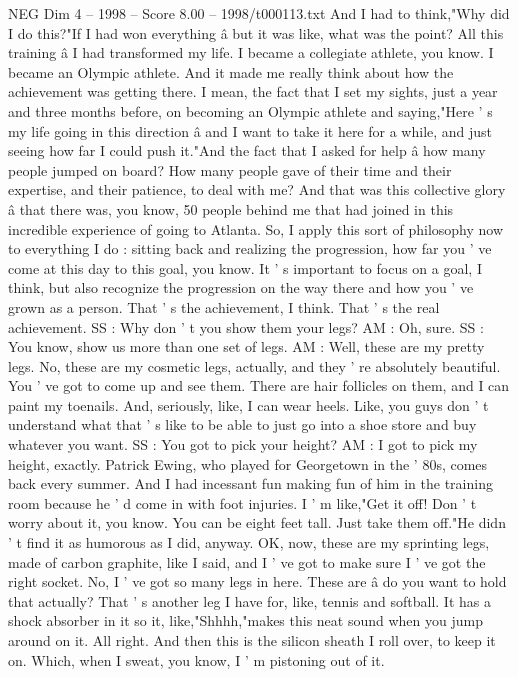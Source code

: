 \begin{textsample}{NEG Dim 4 – 1998 – Score 8.00 – 1998/t000113.txt}
And I had to think,"Why did I do this?"If I had won everything â but it was like, what was the point?
All this training â I had transformed my life.
I became a collegiate athlete, you know.
I became an Olympic athlete.
And it made me really think about how the achievement was getting there.
I mean, the fact that I set my sights, just a year and three months before, on becoming an Olympic athlete and saying,"Here ' s my life going in this direction â and I want to take it here for a while, and just seeing how far I could push it."And the fact that I asked for help â how many people jumped on board?
How many people gave of their time and their expertise, and their patience, to deal with me?
And that was this collective glory â that there was, you know, 50 people behind me that had joined in this incredible experience of going to Atlanta.
So, I apply this sort of philosophy now to everything I do : sitting back and realizing the progression, how far you ' ve come at this day to this goal, you know.
It ' s important to focus on a goal, I think, but also recognize the progression on the way there and how you ' ve grown as a person.
That ' s the achievement, I think.
That ' s the real achievement.
SS : Why don ' t you show them your legs?
AM : Oh, sure.
SS : You know, show us more than one set of legs.
AM : Well, these are my pretty legs.
No, these are my cosmetic legs, actually, and they ' re absolutely beautiful.
You ' ve got to come up and see them.
There are hair follicles on them, and I can paint my toenails.
And, seriously, like, I can wear heels.
Like, you guys don ' t understand what that ' s like to be able to just go into a shoe store and buy whatever you want.
SS : You got to pick your height?
AM : I got to pick my height, exactly.
Patrick Ewing, who played for Georgetown in the ' 80s, comes back every summer.
And I had incessant fun making fun of him in the training room because he ' d come in with foot injuries.
I ' m like,"Get it off!
Don ' t worry about it, you know.
You can be eight feet tall.
Just take them off."He didn ' t find it as humorous as I did, anyway.
OK, now, these are my sprinting legs, made of carbon graphite, like I said, and I ' ve got to make sure I ' ve got the right socket.
No, I ' ve got so many legs in here.
These are â do you want to hold that actually?
That ' s another leg I have for, like, tennis and softball.
It has a shock absorber in it so it, like,"Shhhh,"makes this neat sound when you jump around on it.
All right.
And then this is the silicon sheath I roll over, to keep it on.
Which, when I sweat, you know, I ' m pistoning out of it.

\end{textsample}
